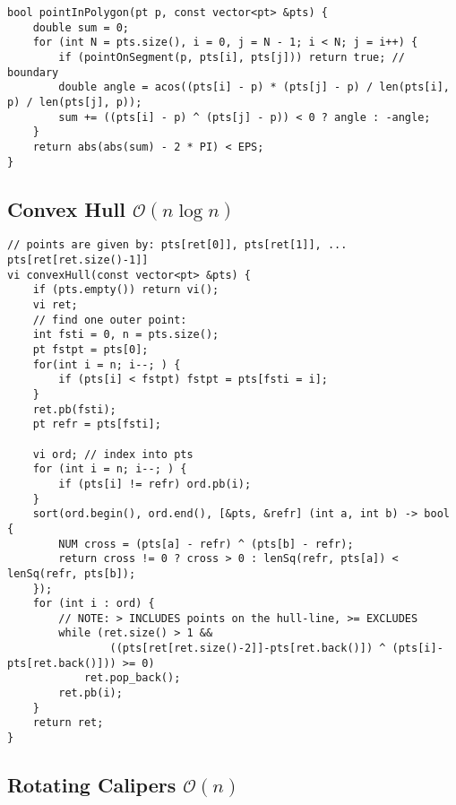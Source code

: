 \documentclass[8pt,a4paper,landscape,oneside]{amsart}
\begin{document}
\begin{multicols*}{3}
\begin{lstlisting}
bool pointInPolygon(pt p, const vector<pt> &pts) {
	double sum = 0;
	for (int N = pts.size(), i = 0, j = N - 1; i < N; j = i++) {
		if (pointOnSegment(p, pts[i], pts[j])) return true; // boundary
		double angle = acos((pts[i] - p) * (pts[j] - p) / len(pts[i], p) / len(pts[j], p));
		sum += ((pts[i] - p) ^ (pts[j] - p)) < 0 ? angle : -angle;
	}
	return abs(abs(sum) - 2 * PI) < EPS;
}
\end{lstlisting}

\begin{comment}
// Assumption: polygon has unique points
// 0: no, 1: yes, 2: on boundary
int pointInConvex(pt p, const vector<pt> &pts) {
bool onBoundary = false;
for (int N = pts.size(), sgn = 0, i = 0, j = N - 1; i < N; j = i++) {
NUM cross = (pts[i] - p) ^ (pts[j] - p);
int s = (cross > 0) - (cross < 0);
if (cross == 0) onBoundary = true;
else if (sgn == 0) sgn = s;
else if (sgn != s) return 0;
}
return onBoundary ? 2 : 1;
}
\end{comment}

\subsection{Convex Hull $\mathcal{O}(n \log n)$}

\begin{lstlisting}
// points are given by: pts[ret[0]], pts[ret[1]], ... pts[ret[ret.size()-1]]
vi convexHull(const vector<pt> &pts) {
	if (pts.empty()) return vi();
	vi ret;
	// find one outer point:
	int fsti = 0, n = pts.size();
	pt fstpt = pts[0];
	for(int i = n; i--; ) {
		if (pts[i] < fstpt) fstpt = pts[fsti = i];
	}
	ret.pb(fsti);
	pt refr = pts[fsti];

	vi ord; // index into pts
	for (int i = n; i--; ) {
		if (pts[i] != refr) ord.pb(i);
	}
	sort(ord.begin(), ord.end(), [&pts, &refr] (int a, int b) -> bool {
		NUM cross = (pts[a] - refr) ^ (pts[b] - refr);
		return cross != 0 ? cross > 0 : lenSq(refr, pts[a]) < lenSq(refr, pts[b]);
	});
	for (int i : ord) {
		// NOTE: > INCLUDES points on the hull-line, >= EXCLUDES
		while (ret.size() > 1 &&
				((pts[ret[ret.size()-2]]-pts[ret.back()]) ^ (pts[i]-pts[ret.back()])) >= 0)
			ret.pop_back();
		ret.pb(i);
	}
	return ret;
}
\end{lstlisting}

\subsection{Rotating Calipers $\mathcal{O}(n)$}


\end{multicols*}
\end{document}
